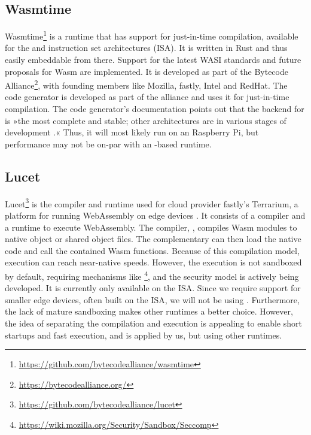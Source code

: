 \subsection{Wasmtime}

Wasmtime\footnote{\url{https://github.com/bytecodealliance/wasmtime}} is a runtime that has support for just-in-time compilation, available for the  and  instruction set architectures (ISA). It is written in Rust and thus easily embeddable from there. Support for the latest WASI standards and future proposals for Wasm are implemented.
It is developed as part of the Bytecode Alliance\footnote{\url{https://bytecodealliance.org/}}, with founding members like Mozilla, fastly, Intel and RedHat. The  code generator is developed as part of the alliance and  uses it for just-in-time compilation. The code generator's documentation points out that the backend for  is »the most complete and stable; other architectures are in various stages of development \cite{Alliance2021}.« 
Thus, it will most likely run on an  Raspberry Pi, but performance may not be on-par with an -based runtime.

\subsection{Lucet}

Lucet\footnote{\url{https://github.com/bytecodealliance/lucet}} is the compiler and runtime used for cloud provider fastly's Terrarium, a platform for running WebAssembly on edge devices \cite{fastly2019}. It consists of a compiler and a runtime to execute WebAssembly. The compiler, , compiles Wasm modules to native object or shared object files. The complementary  can then load the native code and call the contained Wasm functions. Because of this compilation model, execution can reach near-native speeds. However, the execution is not sandboxed by default, requiring mechanisms like \footnote{\url{https://wiki.mozilla.org/Security/Sandbox/Seccomp}}, and the security model is actively being developed. It is currently only available on the  ISA. Since we require support for smaller edge devices, often built on the  ISA, we will not be using . Furthermore, the lack of mature sandboxing makes other runtimes a better choice. However, the idea of separating the compilation and execution is appealing to enable short startups and fast execution, and is applied by us, but using other runtimes.

